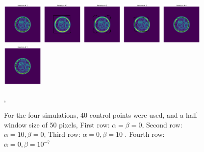 \documentclass[24pt]{article}
\begin{document}
\begin{figure}[h!]
          \includegraphics[width=0.18\textwidth]{it_5_alph_0_bet_10.png}
          \includegraphics[width=0.18\textwidth]{it_1_alph_0_bet_10_min7.png}
    \includegraphics[width=0.18\textwidth]{it_2_alph_0_bet_10_min7.png}
      \includegraphics[width=0.18\textwidth]{it_3_alph_0_bet_10_min7.png}
        \includegraphics[width=0.18\textwidth]{it_4_alph_0_bet_10_min7.png}
          \includegraphics[width=0.18\textwidth]{it_5_alph_0_bet_10_min7.png}          
  \caption{For the four simulations, 40 control points were used, and a half window size of 50 pixels, First row: $\alpha= \beta = 0$, Second row: $\alpha= 10, \beta = 0$, 
  Third row: $\alpha= 0, \beta = 10$ . Fourth row: $\alpha= 0, \beta = 10^{-7}$}, 
  \label{fig:snake_results}
\end{figure}
\end{document}
